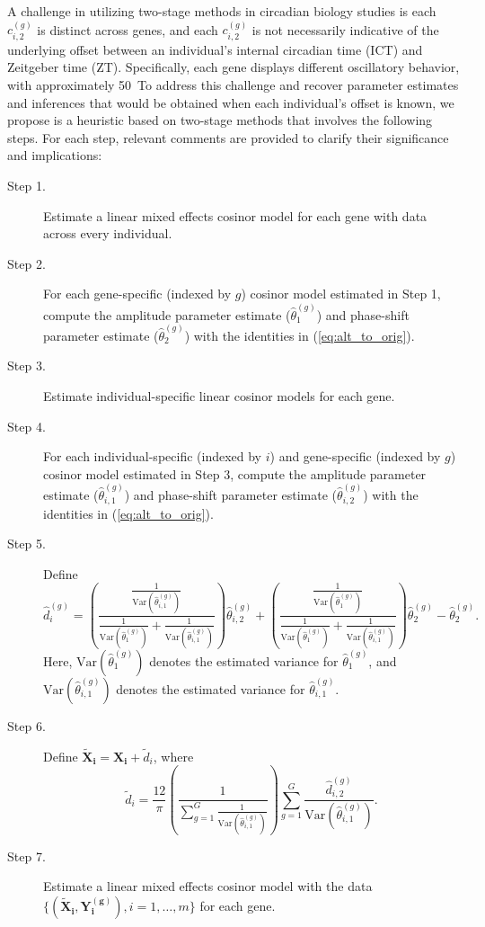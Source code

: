 A challenge in utilizing two-stage methods in circadian biology studies is each $c_{i,2}^{(g)}$ is distinct across genes, and each $c_{i,2}^{(g)}$ is not necessarily indicative of the underlying offset between an individual's internal circadian time (ICT) and Zeitgeber time (ZT). Specifically, each gene displays different oscillatory behavior, with approximately 50\
To address this challenge and recover parameter estimates and inferences that would be obtained when each individual's offset is known, we propose is a heuristic based on two-stage methods that involves the following steps. For each step, relevant comments are provided to clarify their significance and implications:
\begin{description}
    \item[Step 1.] Estimate a linear mixed effects cosinor model for each gene with data across every individual.
    \item[Step 2.] For each gene-specific (indexed by $g$) cosinor model estimated in Step 1, compute the amplitude parameter estimate ($\hat{\theta}_1^{(g)}$) and phase-shift parameter estimate ($\hat{\theta}_{2}^{(g)}$) with the identities in (\ref{eq:alt_to_orig}). 
    \item[Step 3.] Estimate individual-specific linear cosinor models for each gene.
    \item[Step 4.] For each individual-specific (indexed by $i$) and gene-specific (indexed by $g$) cosinor model estimated in Step 3, compute the amplitude parameter estimate ($\hat{\theta}_{i,1}^{(g)}$) and phase-shift parameter estimate ($\hat{\theta}_{i,2}^{(g)}$) with the identities in (\ref{eq:alt_to_orig}). 
    \item[Step 5.] Define $$\hat{d}^{(g)}_{i} = \left(\frac{\frac{1}{\mathrm{Var}(\hat{\theta}^{(g)}_{i,1})}}{\frac{1}{\mathrm{Var}(\hat{\theta}^{(g)}_1)}+\frac{1}{\mathrm{Var}(\hat{\theta}^{(g)}_{i,1})}}\right)\hat{\theta}^{(g)}_{i,2} + \left(\frac{\frac{1}{\mathrm{Var}(\hat{\theta}^{(g)}_{1})}}{\frac{1}{\mathrm{Var}(\hat{\theta}^{(g)}_1)}+\frac{1}{\mathrm{Var}(\hat{\theta}^{(g)}_{i,1})}}\right)\hat{\theta}^{(g)}_{2} - \hat{\theta}^{(g)}_2.$$Here, $\mathrm{Var}(\hat{\theta}^{(g)}_1)$ denotes the estimated variance for $\hat{\theta}^{(g)}_1$, and $\mathrm{Var}(\hat{\theta}^{(g)}_{i,1})$ denotes the estimated variance for $\hat{\theta}^{(g)}_{i,1}$.
    \item[Step 6.]  Define $\boldsymbol{\tilde{X}_i} = \boldsymbol{X_i}+\tilde{d}_{i}$, where $$\tilde{d}_{i} = \frac{12}{\pi}\left(\frac{1}{\sum_{g=1}^G\frac{1}{\mathrm{Var}(\hat{\theta}^{(g)}_{i,1})}}\right)\sum_{g=1}^G\frac{\hat{d}_{i,2}^{(g)}}{\mathrm{Var}(\hat{\theta}^{(g)}_{i,1})}.$$
    \item[Step 7.] Estimate a linear mixed effects cosinor model with the data $\{(\boldsymbol{\tilde{X}_i}, \boldsymbol{Y_i^{(g)}}), i = 1,\ldots, m\}$ for each gene.
\end{description}
